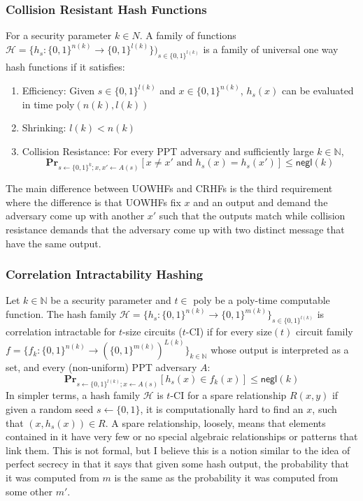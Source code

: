 \documentclass[12pt]{article}%
\newcommand{\N}{\mathbb{N}}
\begin{document}
\subsubsection{Collision Resistant Hash Functions}

For a security parameter $k \in N$. A family of functions $\mathcal{H} = \{h_s: \{0, 1\}^{n(k) } \to \{0, 1\}^{l(k)}\})_{s \in \{0, 1\}^{l(k)}}$ is a family of universal one way hash functions if it satisfies: \begin{enumerate}
    \item Efficiency: Given $s \in \{0, 1\}^{l(k)}$ and $x \in \{0, 1\}^{n(k)}$, $h_s(x)$ can be evaluated in time poly$(n(k), l(k))$
    \item Shrinking: $l(k) < n(k)$
    \item Collision Resistance: For every PPT adversary and sufficiently large $k \in \N$, $$\textbf{Pr}_{s \xleftarrow{} \{0, 1\}^k; x, x' \xleftarrow{} A(s)} [x \neq x' \text{ and } h_s(x) = h_s(x')] \leq \textsf{negl}(k)$$
\end{enumerate} The main difference between UOWHFs and CRHFs is the third requirement where the difference is that UOWHFs fix $x$ and an output and demand the adversary come up with another $x'$ such that the outputs match while collision resistance demands that the adversary come up with two distinct message that have the same output.


\subsubsection{Correlation Intractability Hashing}

Let $k \in \N$ be a security parameter and $t \in $ poly be a poly-time computable function. The hash family $\mathcal{H} = \{h_s:\{0, 1\}^{n(k)} \to \{0, 1\}^{m(k)}\}_{s \in \{0, 1\}^{l(k)}}$ is correlation intractable for $t$-size circuits ($t$-CI) if for every size$(t)$ circuit family $f = \{f_k: \{0, 1\}^{n(k)} \to (\{0, 1\}^{m(k)})^{L(k)}\}_{k \in \N}$ whose output is interpreted as a set, and every (non-uniform) PPT adversary $A$: $$\textbf{Pr}_{s \xleftarrow{} \{0, 1\}^{l(k)}; x \xleftarrow{} A(s)} [h_s(x) \in f_k(x)] \leq \textsf{negl}(k)$$ In simpler terms, a hash family $\mathcal{H}$ is $t$-CI for a spare relationship $R(x, y)$ if given a random seed $s \xleftarrow{} \{ 0,1\}$, it is computationally hard to find an $x$, such that $(x, h_s(x)) \in R$. A spare relationship, loosely, means that elements contained in it have very few or no special algebraic relationships or patterns that link them. This is not formal, but I believe this is a notion similar to the idea of perfect secrecy in that it says that given some hash output, the probability that it was computed from $m$ is the same as the probability it was computed from some other $m'$. 
\end{document}

